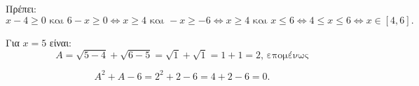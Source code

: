 
\begin{alist}
\item Πρέπει:
\[x - 4 \ge 0 \text{ και } 6 - x \ge 0 \Leftrightarrow x \ge 4 \text{ και } -x \ge -6 \Leftrightarrow x \ge 4 \text{ και } x \le 6 \Leftrightarrow 4 \le x \le 6 \Leftrightarrow x \in [4, 6].\]

\item Για $x = 5$ είναι:
\[A = \sqrt{5 - 4} + \sqrt{6 - 5} = \sqrt{1} + \sqrt{1} = 1 + 1 = 2\text{, επομένως}\]

\[A^2 + A - 6 = 2^2 + 2 - 6 = 4 + 2 - 6 = 0.\]
\end{alist}

